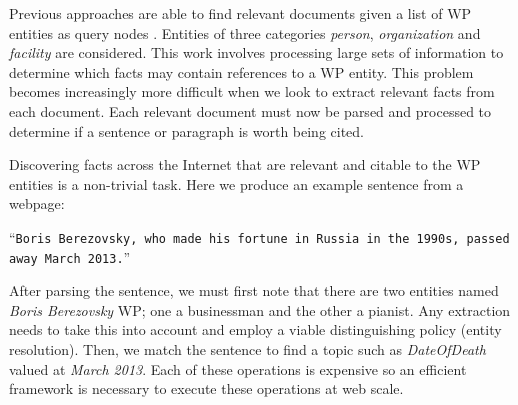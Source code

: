 Previous approaches are able to find relevant documents given a list of WP
entities as query nodes \cite{mcnamee2012hltcoe, dalton2013bi,
Bonnefoy:2013:WDE:2484028.2484180, Balog:2013:CCR:2484028.2484151,ji2011knowledge}.
Entities of three categories \textit{person}, \textit{organization} and \textit{facility} are considered.
This work involves processing large sets of information to determine which facts may contain references to a WP entity. 
This problem becomes increasingly more difficult when we look to extract relevant facts from
each document.
Each relevant document must now be parsed and processed to determine if a sentence or paragraph is worth being cited.

Discovering facts across the Internet that are relevant and citable to the WP entities is a non-trivial task.
Here we produce an example sentence from a webpage: 

``{\small \texttt{Boris Berezovsky, who made his fortune in Russia in the 1990s, passed away March 2013.}}''

After parsing the sentence, we must first note that there are two entities named \textit{Boris Berezovsky} WP; one a businessman and the other a pianist.
Any extraction needs to take this into account and employ a viable distinguishing policy (entity resolution).
Then, we match the sentence to find a topic such as \textit{DateOfDeath} valued at \textit{March 2013}.
Each of these operations is expensive so an efficient framework is necessary to execute these operations at web scale.


